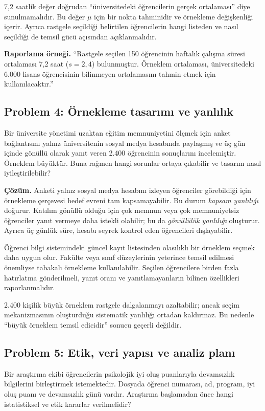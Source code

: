 7,2 saatlik değer doğrudan ``üniversitedeki öğrencilerin gerçek ortalaması''
diye sunulmamalıdır. Bu değer $\mu$ için bir nokta tahminidir ve örnekleme
değişkenliği içerir. Ayrıca rastgele seçildiği belirtilen öğrencilerin hangi
listeden ve nasıl seçildiği de temsil gücü açısından açıklanmalıdır.

\textbf{Raporlama örneği.} ``Rastgele seçilen 150 öğrencinin haftalık çalışma
süresi ortalaması 7,2 saat ($s=2{,}4$) bulunmuştur. Örneklem ortalaması,
üniversitedeki 6.000 lisans öğrencisinin bilinmeyen ortalamasını tahmin etmek
için kullanılacaktır.''

\subsection*{Problem 4: Örnekleme tasarımı ve yanlılık}

Bir üniversite yönetimi uzaktan eğitim memnuniyetini ölçmek için anket
bağlantısını yalnız üniversitenin sosyal medya hesabında paylaşmış ve üç gün
içinde gönüllü olarak yanıt veren 2.400 öğrencinin sonuçlarını incelemiştir.
Örneklem büyüktür. Buna rağmen hangi sorunlar ortaya çıkabilir ve tasarım
nasıl iyileştirilebilir?

\textbf{Çözüm.} Anketi yalnız sosyal medya hesabını izleyen öğrenciler
görebildiği için örnekleme çerçevesi hedef evreni tam kapsamayabilir. Bu durum
\emph{kapsam yanlılığı} doğurur. Katılım gönüllü olduğu için çok memnun veya
çok memnuniyetsiz öğrenciler yanıt vermeye daha istekli olabilir; bu da
\emph{gönüllülük yanlılığı} oluşturur. Ayrıca üç günlük süre, hesabı seyrek
kontrol eden öğrencileri dışlayabilir.

Öğrenci bilgi sistemindeki güncel kayıt listesinden olasılıklı bir örneklem
seçmek daha uygun olur. Fakülte veya sınıf düzeylerinin yeterince temsil
edilmesi önemliyse tabakalı örnekleme kullanılabilir. Seçilen öğrencilere
birden fazla hatırlatma gönderilmeli, yanıt oranı ve yanıtlamayanların bilinen
özellikleri raporlanmalıdır.

2.400 kişilik büyük örneklem rastgele dalgalanmayı azaltabilir; ancak seçim
mekanizmasının oluşturduğu sistematik yanlılığı ortadan kaldırmaz. Bu nedenle
``büyük örneklem temsil edicidir'' sonucu geçerli değildir.

\subsection*{Problem 5: Etik, veri yapısı ve analiz planı}

Bir araştırma ekibi öğrencilerin psikolojik iyi oluş puanlarıyla devamsızlık
bilgilerini birleştirmek istemektedir. Dosyada öğrenci numarası, ad, program,
iyi oluş puanı ve devamsızlık günü vardır. Araştırma başlamadan önce hangi
istatistiksel ve etik kararlar verilmelidir?

